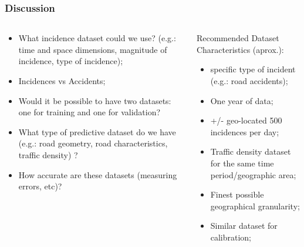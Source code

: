 \documentclass[hyperref={pdfpagelabels=true}]{beamer}
\begin{document}
\begin{frame}
\frametitle{Discussion}
\small
\begin{columns}
  \begin{column}{0.5\textwidth}  
  \begin{itemize}
  \item What incidence dataset could we use? (e.g.: time and space dimensions, magnitude of incidence, type of incidence);
  \item Incidences vs Accidents;
  \item Would it be possible to have two datasets: one for training and one for validation?%
  \item What type of predictive dataset do we have (e.g.: road geometry, road characteristics, traffic density) ?
  \item How accurate are these datasets (measuring errors, etc)?%
  \end{itemize}
  \end{column}
  \begin{column}{0.5\textwidth}  
    \begin{block}{Recommended Dataset Characteristics (aprox.):}
    \begin{itemize}      
      \item specific type of incident (e.g.: road accidents);
      \item One year of data;
      \item +/- geo-located 500 incidences per day;
      \item Traffic density dataset for the same time period/geographic area;
      \item Finest possible geographical granularity;
      \item Similar dataset for calibration;      
    \end{itemize}      
    \end{block}
  \end{column}
\end{columns}
\end{frame}
\end{document}
